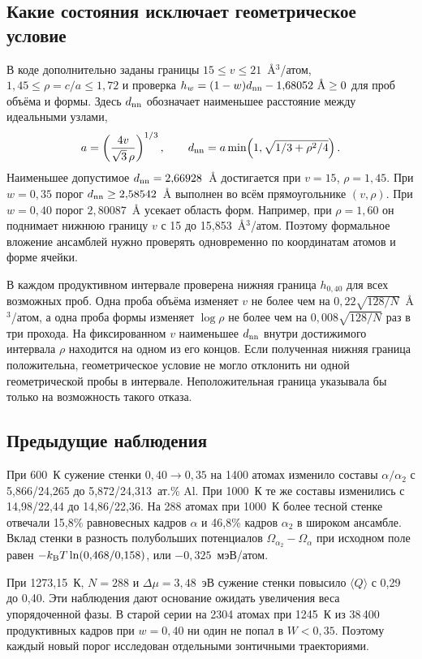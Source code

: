 \documentclass[11pt,a4paper]{article}
\begin{document}
\subsection*{Какие состояния исключает геометрическое условие}
В коде дополнительно заданы границы \(15\le v\le21\)~\AA$^3$/атом, \(1{,}45\le\rho=c/a\le1{,}72\) и проверка \(h_w=(1-w)d_{\rm nn}-1{,}68052~\text{\AA}\ge0\) для проб объёма и формы. Здесь \(d_{\rm nn}\) обозначает наименьшее расстояние между идеальными узлами,
\[
 a=\left(\frac{4v}{\sqrt3\,\rho}\right)^{1/3},\qquad
 d_{\rm nn}=a\min\!\left(1,\sqrt{1/3+\rho^2/4}\right).
\]
Наименьшее допустимое \(d_{\rm nn}=2{,}66928\)~\AA{} достигается при \(v=15\), \(\rho=1{,}45\). При \(w=0{,}35\) порог \(d_{\rm nn}\ge2{,}58542\)~\AA{} выполнен во всём прямоугольнике \((v,\rho)\). При \(w=0{,}40\) порог \(2{,}80087\)~\AA{} усекает область форм. Например, при \(\rho=1{,}60\) он поднимает нижнюю границу \(v\) с 15 до 15,853~\AA$^3$/атом. Поэтому формальное вложение ансамблей нужно проверять одновременно по координатам атомов и форме ячейки.

В каждом продуктивном интервале проверена нижняя граница \(h_{0{,}40}\) для всех возможных проб. Одна проба объёма изменяет \(v\) не более чем на \(0{,}22\sqrt{128/N}\)~\AA$^3$/атом, а одна проба формы изменяет \(\log\rho\) не более чем на \(0{,}008\sqrt{128/N}\) раз в три прохода. На фиксированном \(v\) наименьшее \(d_{\rm nn}\) внутри достижимого интервала \(\rho\) находится на одном из его концов. Если полученная нижняя граница положительна, геометрическое условие не могло отклонить ни одной геометрической пробы в интервале. Неположительная граница указывала бы только на возможность такого отказа.

\subsection*{Предыдущие наблюдения}
При 600~К сужение стенки \(0{,}40\to0{,}35\) на 1400 атомах изменило составы \(\alpha/\alpha_2\) с 5,866/24,265 до 5,872/24,313~ат.\% Al. При 1000~К те же составы изменились с 14,98/22,44 до 14,86/22,36. На 288 атомах при 1000~К более тесной стенке отвечали 15,8\% равновесных кадров \(\alpha\) и 46,8\% кадров \(\alpha_2\) в широком ансамбле. Вклад стенки в разность полубольших потенциалов \(\Omega_{\alpha_2}-\Omega_{\alpha}\) при исходном поле равен \(-k_{\rm B}T\ln(0{,}468/0{,}158)\), или \(-0{,}325\)~мэВ/атом.

При 1273,15~К, \(N=288\) и \(\Delta\mu=3{,}48\)~эВ сужение стенки повысило \(\langle Q\rangle\) с 0,29 до 0,40. Эти наблюдения дают основание ожидать увеличения веса упорядоченной фазы. В старой серии на 2304 атомах при 1245~К из 38\,400 продуктивных кадров при \(w=0{,}40\) ни один не попал в \(W<0{,}35\). Поэтому каждый новый порог исследован отдельными зонтичными траекториями.
\end{document}
